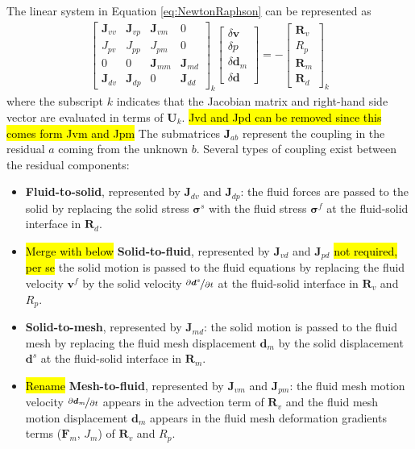\documentclass[sn-mathphys,Numbered]{sn-jnl}%
\newcommand{\bb}{\boldsymbol}
\begin{document}
The linear system in Equation \ref{eq:NewtonRaphson} can be represented as
\begin{eqnarray} \label{eqn:jacobian}
\begin{bmatrix}
\bb{J}_{vv} & \bb{J}_{vp} & \bb{J}_{vm} & 0 \\
J_{pv} & J_{pp} & J_{pm} & 0 \\
0 & 0 & \bb{J}_{mm} & \bb{J}_{md} \\
\bb{J}_{dv} & \bb{J}_{dp} & 0 & \bb{J}_{dd}
\end{bmatrix}_k
\begin{bmatrix}
\delta \bb{v} \\
\delta p \\
\delta \bb{d}_m \\
\delta \bb{d}
\end{bmatrix}
=
-
\begin{bmatrix}
\bb{R}_v  \\
R_p \\
\bb{R}_m \\
\bb{R}_d
\end{bmatrix}_k
\end{eqnarray}
where the subscript $k$ indicates that the Jacobian matrix and right-hand side vector are evaluated in terms of $\bb{U}_k$.
\hl{Jvd and Jpd can be removed since this comes form Jvm and Jpm}
The submatrices $\bb{J}_{ab}$ represent the coupling in the residual $a$ coming from the unknown $b$.
Several types of coupling exist between the residual components:
\begin{itemize}
	\item \textbf{Fluid-to-solid}, represented by $\bb{J}_{dv}$ and $\bb{J}_{dp}$:
	the fluid forces are passed to the solid by replacing the solid stress $\bb{\sigma}^s$ with the fluid stress $\bb{\sigma}^f$ at the fluid-solid interface in $\bb{R}_d$.
	\item \hl{Merge with below}  \textbf{Solid-to-fluid}, represented by $\bb{J}_{vd}$ and $\bb{J}_{pd}$ \hl{not required, per se}
	the solid motion is passed to the fluid equations by replacing the fluid velocity $\bb{v}^f$ by the solid velocity $\nicefrac{\partial \bb{d}^s}{\partial t}$ at the fluid-solid interface in $\bb{R}_v$ and $R_p$.
	\item \textbf{Solid-to-mesh}, represented by $\bb{J}_{md}$:
	the solid motion is passed to the fluid mesh by replacing the fluid mesh displacement $\bb{d}_m$ by the solid displacement $\bb{d}^s$ at the fluid-solid interface in $\bb{R}_m$. 
	\item \hl{Rename} \textbf{Mesh-to-fluid}, represented by $\bb{J}_{vm}$ and $\bb{J}_{pm}$:
	the fluid mesh motion velocity $\nicefrac{\partial \bb{d}_m}{\partial t}$ appears in the advection term of $\bb{R}_v$ and the fluid mesh motion displacement $\bb{d}_m$ appears in the fluid mesh deformation gradients terms ($\bb{F}_m$, $J_m$) of $\bb{R}_v$ and $R_p$.
\end{itemize}
\end{document}
